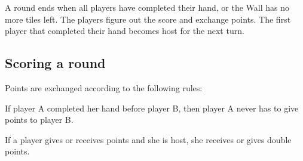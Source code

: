 \documentclass{article}
\begin{document}
A round ends when all players have completed their hand, or the Wall has no more tiles left. The players figure out the score and exchange points. The first player that completed their hand becomes host for the next turn.

\subsection{Scoring a round}
Points are exchanged according to the following rules:
\begin{itemize*}
    \item If player A completed her hand before player B, then player A never has to give points to player B.
    \item If a player gives or receives points and she is host, she receives or gives double points.

\end{itemize*}

\end{document}
